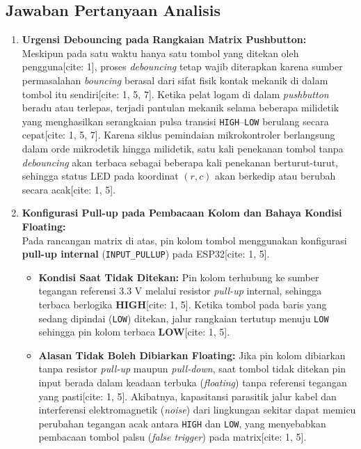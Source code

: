 \subsection{Jawaban Pertanyaan Analisis}
\begin{enumerate}
    \item \textbf{Urgensi Debouncing pada Rangkaian Matrix Pushbutton:} \\
    Meskipun pada satu waktu hanya satu tombol yang ditekan oleh pengguna[cite: 1], proses \textit{debouncing} tetap wajib diterapkan karena sumber permasalahan \textit{bouncing} berasal dari sifat fisik kontak mekanik di dalam tombol itu sendiri[cite: 1, 5, 7]. Ketika pelat logam di dalam \textit{pushbutton} beradu atau terlepas, terjadi pantulan mekanik selama beberapa milidetik yang menghasilkan serangkaian pulsa transisi \texttt{HIGH}--\texttt{LOW} berulang secara cepat[cite: 1, 5, 7]. Karena siklus pemindaian mikrokontroler berlangsung dalam orde mikrodetik hingga milidetik, satu kali penekanan tombol tanpa \textit{debouncing} akan terbaca sebagai beberapa kali penekanan berturut-turut, sehingga status LED pada koordinat $(r,c)$ akan berkedip atau berubah secara acak[cite: 1, 5].

    \item \textbf{Konfigurasi Pull-up pada Pembacaan Kolom dan Bahaya Kondisi Floating:} \\
    Pada rancangan matrix di atas, pin kolom tombol menggunakan konfigurasi \textbf{pull-up internal} (\texttt{INPUT\_PULLUP}) pada ESP32[cite: 1, 5].
    \begin{itemize}
        \item \textbf{Kondisi Saat Tidak Ditekan:} Pin kolom terhubung ke sumber tegangan referensi $3.3\text{ V}$ melalui resistor \textit{pull-up} internal, sehingga terbaca berlogika \textbf{HIGH}[cite: 1, 5]. Ketika tombol pada baris yang sedang dipindai (\texttt{LOW}) ditekan, jalur rangkaian tertutup menuju \texttt{LOW} sehingga pin kolom terbaca \textbf{LOW}[cite: 1, 5].
        \item \textbf{Alasan Tidak Boleh Dibiarkan Floating:} Jika pin kolom dibiarkan tanpa resistor \textit{pull-up} maupun \textit{pull-down}, saat tombol tidak ditekan pin input berada dalam keadaan terbuka (\textit{floating}) tanpa referensi tegangan yang pasti[cite: 1, 5]. Akibatnya, kapasitansi parasitik jalur kabel dan interferensi elektromagnetik (\textit{noise}) dari lingkungan sekitar dapat memicu perubahan tegangan acak antara \texttt{HIGH} dan \texttt{LOW}, yang menyebabkan pembacaan tombol palsu (\textit{false trigger}) pada matrix[cite: 1, 5].
    \end{itemize}


\end{enumerate}
